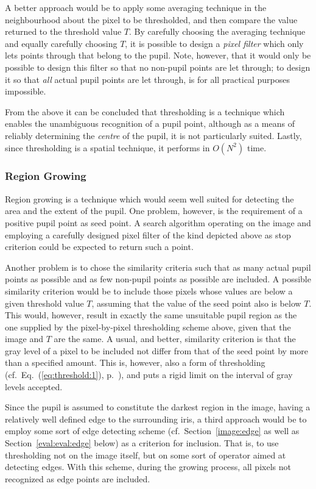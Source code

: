 A better approach would be to apply some averaging technique in the
neighbourhood about the pixel to be thresholded, and then compare the
value returned to the threshold value $T$.  By carefully choosing the
averaging technique and equally carefully choosing $T$, it is possible
to design a {\em pixel filter\/} which only lets points through that
belong to the pupil.  Note, however, that it would only be possible to
design this filter so that no non-pupil points are let through; to
design it so that {\em all\/} actual pupil points are let through, is
for all practical purposes impossible.

From the above it can be concluded that thresholding is a technique
which enables the unambiguous recognition of a pupil point, although
as a means of reliably determining the {\em centre\/} of the pupil, it 
is not particularly suited.  Lastly, since thresholding is a spatial
technique, it performs in $O(N^{2})$ time.

\subsubsection{Region Growing}

Region growing is a technique which would seem well suited for
detecting the area and the extent of the pupil.  One problem, however,
is the requirement of a positive pupil point as seed point.  A search
algorithm operating on the image and employing a carefully designed
pixel filter of the kind depicted above as stop criterion could be
expected to return such a point.

Another problem is to chose the similarity criteria such that as many
actual pupil points as possible and as few non-pupil points as
possible are included.  A possible similarity criterion would be to
include those pixels whose values are below a given threshold value
$T$, assuming that the value of the seed point also is below $T$.
This would, however, result in exactly the same unsuitable pupil
region as the one supplied by the pixel-by-pixel thresholding scheme
above, given that the image and $T$ are the same.  A usual, and
better, similarity criterion is that the gray level of a pixel to be
included not differ from that of the seed point by more than a
specified amount.  This is, however, also a form of thresholding
(cf.\ Eq.~(\ref{eq:threshold:1}), p.~\pageref{eq:threshold:1}), and
puts a rigid limit on the interval of gray levels accepted.

Since the pupil is assumed to constitute the darkest region in the
image, having a relatively well defined edge to the surrounding iris,
a third approach would be to employ some sort of edge detecting scheme
(cf.\ Section~\ref{image:edge} as well as Section~\ref{eval:eval:edge}
below) as a criterion for inclusion.  That is, to use thresholding not
on the image itself, but on some sort of operator aimed at detecting
edges.  With this scheme, during the growing process, all pixels not
recognized as edge points are included.

